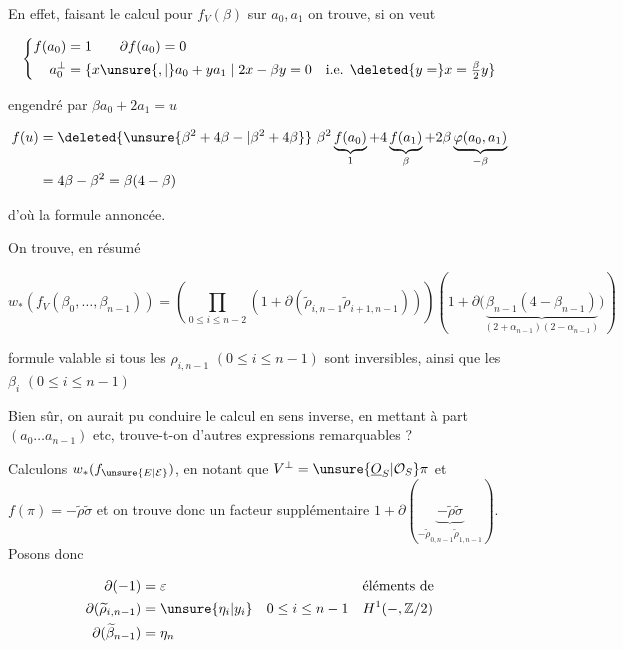 En effet, faisant le calcul pour $f_V(\beta)$ sur $a_0,a_1$ on trouve, si on veut

\[\left\{\begin{aligned}f(a_0)&=1\qquad\partial f(a_0)=0\\a_0^\perp&=\{x\unsure{,|{}}a_0+ya_1\mid 2x-\beta y=0\quad\text{i.e. }\deleted{y=}x=\tfrac\beta2y\}\end{aligned}\right.\]

engendré par $\beta a_0+2a_1=u$

\[\begin{aligned}f(u)&=\deleted{\unsure{\beta^2+4\beta-|\beta^2+4\beta}}\ \beta^2\underbrace{f(a_0)}_1+4\underbrace{f(a_1)}_\beta+2\beta\underbrace{\varphi(a_0,a_1)}_{-\beta}\\ &=4\beta-\beta^2=\beta(4-\beta)\end{aligned}\]

d'où  la formule annoncée.


On trouve, en résumé

\[w_*(f_V(\beta_0,\ldots,\beta_{n-1}))=\left(\prod_{0\leq i\leq n-2}(1+\partial(\widetilde\rho_{i,n-1}\widetilde\rho_{i+1,n-1}))\right)\left(1+\partial\bigl(\underbrace{\beta_{n-1}(4-\beta_{n-1})}_{(2+\alpha_{n-1})(2-\alpha_{n-1})}\bigr)\right)\]

formule valable si tous les $\rho_{i,n-1}$ $(0\leq i\leq n-1)$ sont inversibles, ainsi que les $\beta_i$ $(0\leq i\leq n-1)$

Bien sûr, on aurait pu conduire le calcul en sens inverse, en mettant à part $(a_0\ldots a_{n-1})$ etc,  trouve-t-on d'autres expressions remarquables ?

Calculons $w_*(f_{\unsure{E|\mathcal E}})$,  en notant que $V^\perp=\unsure{\underline O_S|\mathcal O_S}\pi$ et $f(\pi)=-\widetilde\rho\widetilde\sigma$ et on trouve donc un facteur supplémentaire $1+\partial(\underbrace{-\widetilde\rho\widetilde\sigma}_{-\widetilde\rho_{0,n-1}\widetilde\rho_{1,n-1}})$. Posons donc

\[\begin{aligned}\partial(-1)&=\varepsilon&&&&\text{éléments de}\\ \partial(\widetilde\rho_{i,n-1})&=\unsure{\eta_i|y_i}&&0\leq i\leq n-1&& H^1(-,\mathbb Z/2)\\\partial(\widetilde\beta_{n-1})&=\eta_n\end{aligned}\]

